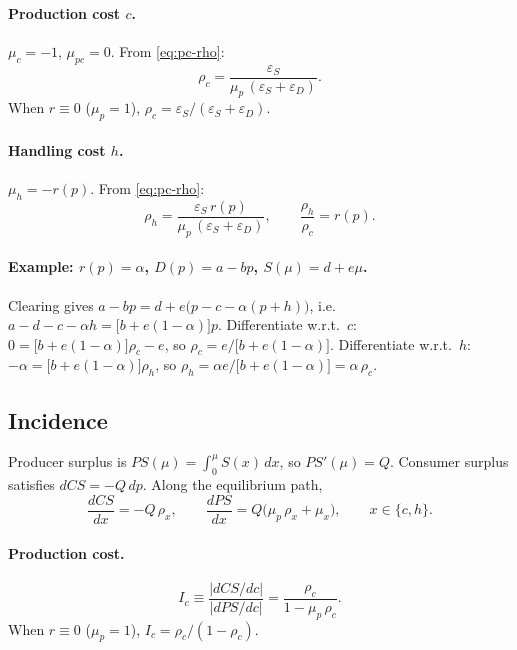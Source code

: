 \documentclass[11pt]{article}
\begin{document}
\paragraph{Production cost $c$.}
$\mu_c=-1$, $\mu_{pc}=0$.  From \eqref{eq:pc-rho}:
\begin{equation}
  \rho_c
  = \frac{\varepsilon_S}{\mu_p\,(\varepsilon_S+\varepsilon_D)}.
  \label{eq:pc-rho-c}
\end{equation}
When $r\equiv 0$ ($\mu_p=1$), $\rho_c=\varepsilon_S/(\varepsilon_S+\varepsilon_D)$.

\paragraph{Handling cost $h$.}
$\mu_h=-r(p)$.  From \eqref{eq:pc-rho}:
\begin{equation}
  \rho_h
  = \frac{\varepsilon_S\,r(p)}{\mu_p\,(\varepsilon_S+\varepsilon_D)},
  \qquad
  \frac{\rho_h}{\rho_c} = r(p).
  \label{eq:pc-rho-h}
\end{equation}

\paragraph{Example: $r(p)=\alpha$, $D(p)=a-bp$, $S(\mu)=d+e\mu$.}
Clearing gives $a-bp=d+e\bigl(p-c-\alpha(p+h)\bigr)$, i.e.\
$a-d-c-\alpha h = \bigl[b+e(1-\alpha)\bigr]p$.  Differentiate w.r.t.\ $c$:
$0=\bigl[b+e(1-\alpha)\bigr]\rho_c - e$, so
$\rho_c = e/\bigl[b+e(1-\alpha)\bigr]$.
Differentiate w.r.t.\ $h$:
$-\alpha=\bigl[b+e(1-\alpha)\bigr]\rho_h$, so
$\rho_h = \alpha e/\bigl[b+e(1-\alpha)\bigr]=\alpha\,\rho_c$.

\subsection{Incidence}

Producer surplus is $PS(\mu)=\int_0^\mu S(x)\,dx$, so $PS'(\mu)=Q$.
Consumer surplus satisfies $dCS=-Q\,dp$.  Along the equilibrium path,
\begin{equation}
  \frac{dCS}{dx}=-Q\,\rho_x,
  \qquad
  \frac{dPS}{dx}=Q\bigl(\mu_p\,\rho_x+\mu_x\bigr),
  \qquad x\in\{c,h\}.
  \label{eq:pc-burden}
\end{equation}

\paragraph{Production cost.}
\begin{equation}
  I_c \equiv \frac{|dCS/dc|}{|dPS/dc|}
  = \frac{\rho_c}{1-\mu_p\,\rho_c}.
  \label{eq:pc-Ic}
\end{equation}
When $r\equiv 0$ ($\mu_p=1$), $I_c=\rho_c/(1-\rho_c)$.
\end{document}
